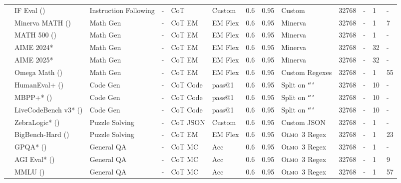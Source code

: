 \documentclass[table]{ai2style/ai2}
\newcommand{\newOlmo}{Olmo\xspace}
\newcommand{\olmothree}{\textsc{\newOlmo~3}\xspace}
\begin{document}
\begin{table}[t]
\begin{scriptsize}
\begin{tabular}{HlHHllllllHll}
 & IF Eval (\citeyear{zhou2023instructionfollowingevaluationlargelanguage}) & Instruction Following & - & CoT & Custom & 0.6 & 0.95 & Custom & 32768 & - & 1 & - \\ 
 & Minerva MATH (\citeyear{lewkowycz2022solving}) & Math Gen & - & CoT EM & EM Flex & 0.6 & 0.95 & Minerva & 32768 & - & 1 & 7 \\
 & MATH 500 (\citeyear{lewkowycz2022solving,lightman2023lets}) & Math Gen & - & CoT EM & EM Flex & 0.6 & 0.95 & Minerva & 32768 & - & 1 & - \\
 & AIME 2024* & Math Gen & - & CoT EM & EM Flex & 0.6 & 0.95 & Minerva & 32768 & - & 32 & - \\
 & AIME 2025* & Math Gen & - & CoT EM & EM Flex & 0.6 & 0.95 & Minerva & 32768 & - & 32 & - \\
 & Omega Math (\citeyear{Sun2025OMEGACL}) & Math Gen & - & CoT EM & EM Flex & 0.6 & 0.95 & Custom Regexes & 32768 & - & 1 & 55 \\
 & HumanEval+ (\citeyear{evalplus}) & Code Gen & - & CoT Code & pass@1 & 0.6 & 0.95 & Split on \texttt{```} & 32768 & - & 10 & - \\
 & MBPP+* (\citeyear{evalplus}) & Code Gen & - & CoT Code & pass@1 & 0.6 & 0.95 & Split on \texttt{```} & 32768 & - & 10 & - \\
 & LiveCodeBench v3* (\citeyear{jain2024livecodebench}) & Code Gen & - & CoT Code & pass@1 & 0.6 & 0.95 & Split on \texttt{```} & 32768 & - & 10 & - \\
 & ZebraLogic* (\citeyear{lin2025zebralogic}) & Puzzle Solving & - & CoT JSON & Custom & 0.6 & 0.95 & Custom JSON & 32768 & - & 1 & - \\ 
 & BigBench-Hard (\citeyear{suzgun2022challenging}) & Puzzle Solving & - & CoT EM & EM Flex & 0.6 & 0.95 & \olmothree Regex & 32768 & - & 1 & 23 \\
 & GPQA* (\citeyear{rein2024gpqa}) & General QA & - & CoT MC & Acc & 0.6 & 0.95 & \olmothree Regex & 32768 & - & 1 & - \\
 & AGI Eval* (\citeyear{zhong2023agieval}) & General QA & - & CoT MC & Acc & 0.6 & 0.95 & \olmothree Regex & 32768 & - & 1 & 9 \\
 & MMLU (\citeyear{hendryckstest2021}) & General QA & - & CoT MC & Acc & 0.6 & 0.95 & \olmothree Regex & 32768 & - & 1 & 57 \\

\end{tabular}
\end{scriptsize}
\end{table}
\end{document}
